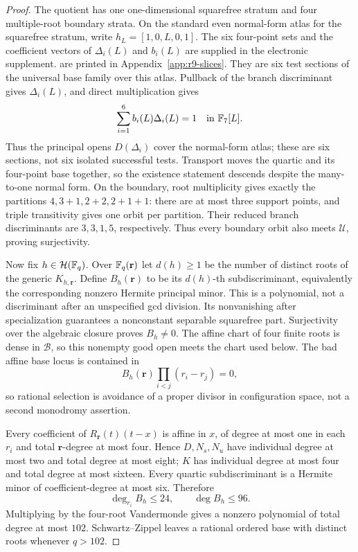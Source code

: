 \begin{proof}
The quotient has one one-dimensional squarefree stratum and four
multiple-root boundary strata.  On the standard even normal-form atlas
for the squarefree stratum, write $h_L=[1,0,L,0,1]$.  The six
four-point sets and the coefficient vectors of $\Delta_i(L)$ and
$b_i(L)$
\ifTITSubmission
are supplied in the electronic supplement.
\else
are printed in Appendix~\ref{app:r9-slices}.
\fi
They are six
test sections of the universal base family over this atlas.  Pullback
of the branch discriminant gives $\Delta_i(L)$, and direct
multiplication gives
\begin{equation}\label{eq:r9-bezout}
             \sum_{i=1}^6 b_i(L)\Delta_i(L)=1
             \quad\text{in }\mathbb F_7[L].
\end{equation}
Thus the principal opens $D(\Delta_i)$ cover the normal-form atlas;
these are six sections, not six isolated successful tests.  Transport
moves the quartic and its four-point base together, so the existence
statement descends despite the many-to-one normal form.  On the
boundary, root multiplicity gives exactly the partitions
$4,3+1,2+2,2+1+1$: there are at most three support points, and triple
transitivity gives one orbit per partition.  Their reduced branch
discriminants are $3,3,1,5$, respectively.  Thus every boundary orbit
also meets $\mathcal U$, proving surjectivity.

Now fix $h\in\mathcal H(\mathbb F_q)$.  Over
$\mathbb F_q(\mathbf r)$ let $d(h)\geq1$ be the number of distinct roots of
the generic $K_{h,\mathbf r}$.  Define $B_h(\mathbf r)$ to be its
$d(h)$-th subdiscriminant, equivalently the corresponding nonzero
Hermite principal minor.  This is a polynomial, not a discriminant
after an unspecified gcd division.  Its nonvanishing after
specialization guarantees a nonconstant separable squarefree part.
Surjectivity over the algebraic closure proves $B_h\ne0$.
The affine chart of four finite roots is dense in $\mathcal B$, so this
nonempty good open meets the chart used below.
The bad affine base locus is contained in
\begin{equation}\label{eq:r9-base-bad}
 B_h(\mathbf r)\prod_{i<j}(r_i-r_j)=0,
\end{equation}
so rational selection is avoidance of a proper divisor in configuration
space, not a second monodromy assertion.

Every coefficient of $R_{\mathbf r}(t)(t-x)$ is affine in $x$, of
degree at most one in each $r_i$ and total $\mathbf r$-degree at most
four.  Hence $D,N_s,N_u$ have individual degree at most two and total
degree at most eight; $K$ has individual degree at most four and total
degree at most sixteen.  Every quartic subdiscriminant is a Hermite
minor of coefficient-degree at most six.  Therefore
\begin{equation}\label{eq:r9-base-degree}
 \deg_{r_i}B_h\leq24,\qquad \deg B_h\leq96.
\end{equation}
Multiplying by the four-root Vandermonde gives a nonzero polynomial of
total degree at most $102$.  Schwartz--Zippel leaves a rational
ordered base with distinct roots whenever $q>102$.
\end{proof}


